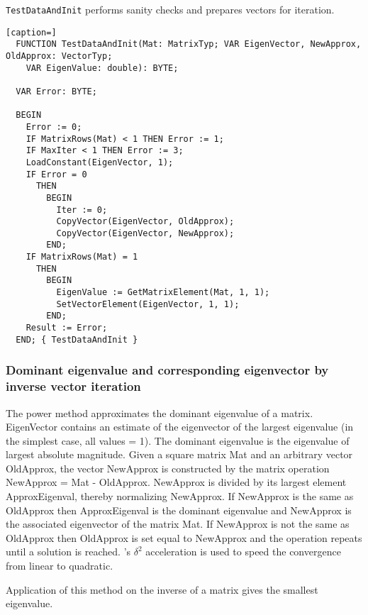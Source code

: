 \texttt{TestDataAndInit} performs sanity checks and prepares vectors for iteration.

\begin{lstlisting}[caption=]
  FUNCTION TestDataAndInit(Mat: MatrixTyp; VAR EigenVector, NewApprox, OldApprox: VectorTyp;
    VAR EigenValue: double): BYTE;

  VAR Error: BYTE;

  BEGIN
    Error := 0;
    IF MatrixRows(Mat) < 1 THEN Error := 1;
    IF MaxIter < 1 THEN Error := 3;
    LoadConstant(EigenVector, 1);
    IF Error = 0
      THEN
        BEGIN
          Iter := 0;
          CopyVector(EigenVector, OldApprox);
          CopyVector(EigenVector, NewApprox);
        END;
    IF MatrixRows(Mat) = 1
      THEN
        BEGIN
          EigenValue := GetMatrixElement(Mat, 1, 1);
          SetVectorElement(EigenVector, 1, 1);
        END;
    Result := Error;
  END; { TestDataAndInit }
\end{lstlisting}

\subsubsection{Dominant eigenvalue and corresponding eigenvector by inverse vector iteration}

The power method approximates the dominant eigenvalue of a matrix. EigenVector contains an estimate of the eigenvector of the largest eigenvalue (in the simplest case, all values = 1). The dominant eigenvalue is the eigenvalue of largest absolute magnitude. Given a square matrix Mat and an arbitrary vector OldApprox, the vector NewApprox is constructed by the matrix operation NewApprox = Mat - OldApprox. NewApprox is divided by its largest element ApproxEigenval, thereby normalizing NewApprox. If NewApprox is the same as OldApprox then ApproxEigenval is the dominant eigenvalue and NewApprox is the associated eigenvector of the matrix Mat. If NewApprox is not the same as OldApprox then OldApprox is set equal to NewApprox and the operation repeats until a solution is reached. 's \(\delta^2 \) acceleration is used to speed the convergence from linear to quadratic.

Application of this method on the inverse of a matrix gives the smallest eigenvalue.

